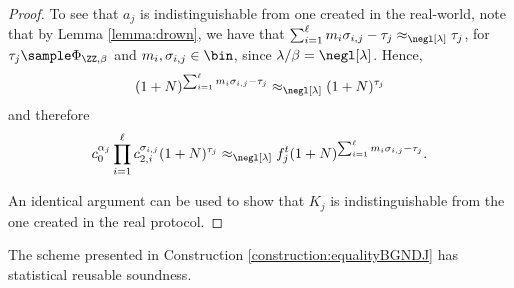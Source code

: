 \begin{proof}
To see that $a_{j}$ is indistinguishable from one created in the real-world, note that by Lemma \ref{lemma:drown}, we have that $\sum_{i=1}^\ell m_i\sigma_{i,j}-\tau_{j} \approx_{\negl[\lambda]}\tau_{j}$, for $\tau_{j}\sample  \Phi_{\ZZ,\beta}$ and $m_i,\sigma_{i,j}\in\bin$, since $\lambda/\beta=\negl[\lambda]$. Hence, $$(1+N)^{\sum_{i=1}^\ell m_i\sigma_{i,j}-\tau_{j}} \approx_{\negl[\lambda]}(1+N)^{\tau_{j}}$$ and therefore 
$$c_0^{\alpha_j}\prod_{i=1}^\ell c_{2,i}^{\sigma_{i,j}}(1+N)^{\tau_{j}}\approx_{\negl[\lambda]} f_{j}^t (1+N)^{\sum_{i=1}^\ell m_i\sigma_{i,j}-\tau_{j}}.$$

An identical argument can be used to show that $K_j$ is indistinguishable from the one created in the real protocol.
% 
\end{proof}


\begin{lemma}
\label{}
The scheme presented in Construction \ref{construction:equalityBGNDJ} has statistical reusable soundness.
\end{lemma}
